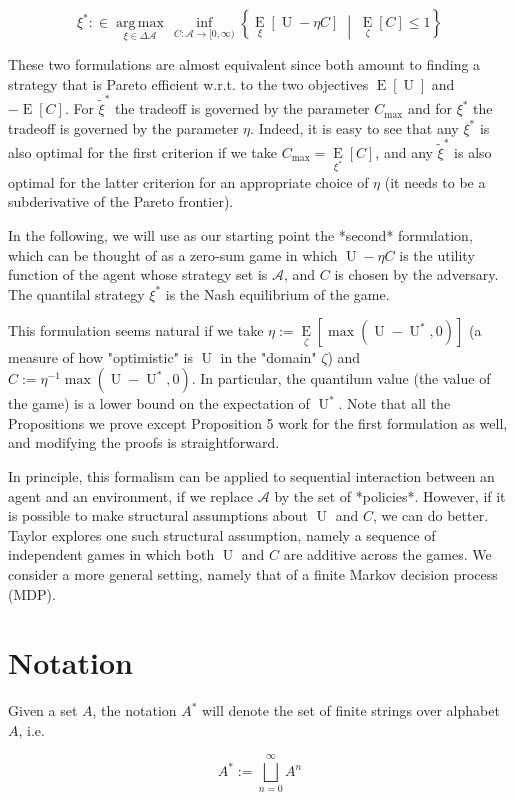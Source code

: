 \documentclass[a4paper]{article}
\newcommand{\AP}[1]{\left(#1\right)}
\newcommand{\AB}[1]{\left[#1\right]}
\newcommand{\ACM}[2]{\left\{#1\;\middle\vert\;#2\right\}}
\newcommand{\Ea}[2]{\underset{#1}{\operatorname{E}}\AB{#2}}
\newcommand{\Argmax}[1]{\underset{#1}{\operatorname{arg\,max}}\,}
\newcommand{\A}{\mathcal{A}}
\newcommand{\Ut}{\operatorname{U}}
\newcommand{\Co}{C}
\begin{document}
$$\xi^* :\in \Argmax{\xi \in \Delta\A}\inf_{\Co:\A\rightarrow[0,\infty)}\ACM{\Ea{\xi}{\Ut-\eta \Co}}{\Ea{\zeta}{\Co} \leq 1}$$

These two formulations are almost equivalent since both amount to finding a strategy that is Pareto efficient w.r.t. to the two objectives $\Ea{}{\Ut}$ and $-\Ea{}{\Co}$. For $\tilde{\xi}^*$ the tradeoff is governed by the parameter $C_{\max}$ and for $\xi^*$ the tradeoff is governed by the parameter $\eta$. Indeed, it is easy to see that any $\xi^*$ is also optimal for the first criterion if we take $C_{\max}=\Ea{\xi^*}{\Co}$, and any $\tilde{\xi}^*$ is also optimal for the latter criterion for an appropriate choice of $\eta$ (it needs to be a subderivative of the Pareto frontier).

In the following, we will use as our starting point the *second* formulation, which can be thought of as a zero-sum game in which $\Ut-\eta \Co$ is the utility function of the agent whose strategy set is $\A$, and $\Co$ is chosen by the adversary. The quantilal strategy $\xi^*$ is the Nash equilibrium of the game.

This formulation seems natural if we take $\eta:=\Ea{\zeta}{\max\AP{\Ut-\Ut^*,0}}$ (a measure of how "optimistic" is $\Ut$ in the "domain" $\zeta$) and $\Co:=\eta^{-1}\max\AP{\Ut-\Ut^*,0}$. In particular, the quantilum value (the value of the game) is a lower bound on the expectation of $\Ut^*$. Note that all the Propositions we prove except Proposition 5 work for the first formulation as well, and modifying the proofs is straightforward.

In principle, this formalism can be applied to sequential interaction between an agent and an environment, if we replace $\A$ by the set of *policies*. However, if it is possible to make structural assumptions about $\Ut$ and $C$, we can do better. Taylor explores one such structural assumption, namely a sequence of independent games in which both $\Ut$ and $\Co$ are additive across the games. We consider a more general setting, namely that of a finite Markov decision process (MDP).

\section{Notation}

Given a set $A$, the notation $A^*$ will denote the set of finite strings over alphabet $A$, i.e.

\[A^* := \bigsqcup_{n = 0}^\infty A^n\]
\end{document}
